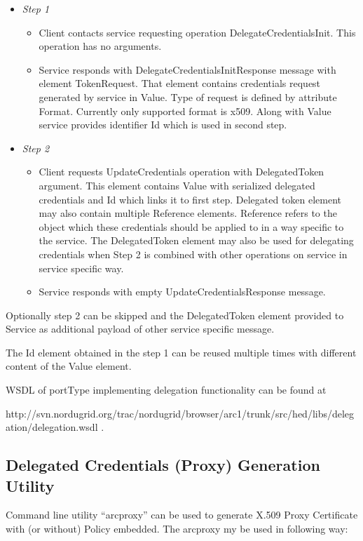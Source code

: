 \documentclass{article}                            %
\begin{document}
    \begin{itemize}
        \item \emph{Step 1}
            \begin{itemize}
                \item Client contacts service requesting operation DelegateCredentialsInit. This operation has no arguments.
                \item Service responds with DelegateCredentialsInitResponse message with element TokenRequest. That element contains credentials request generated by service in Value. Type of request is defined by attribute Format. Currently only supported format is x509. Along with Value service provides identifier Id which is used in second step.
            \end{itemize}
        \item \emph{Step 2}
            \begin{itemize}        
                \item Client requests UpdateCredentials operation with DelegatedToken argument. This element contains Value with serialized delegated credentials and Id which links it to first step. Delegated token element may also contain multiple Reference elements. Reference refers to the object which these credentials should be applied to in a way specific to the service. The DelegatedToken element may also be used for delegating credentials when Step 2 is combined with other operations on service in service specific way.
                \item Service responds with empty UpdateCredentialsResponse message.
            \end{itemize}
    \end{itemize}
Optionally step 2 can be skipped and the DelegatedToken element provided to Service as additional payload of other service specific message. 

The Id element obtained in the step 1 can be reused multiple times with different content of the Value element.

WSDL of portType implementing delegation functionality can be found at 

http://svn.nordugrid.org/trac/nordugrid/browser/arc1/trunk/src/hed/libs/delegation/delegation.wsdl .


\subsection{Delegated Credentials (Proxy) Generation Utility} %
\label{subsec:delegation_client}
Command line utility “arcproxy” can be used to generate X.509 Proxy Certificate with (or without)  Policy embedded.
The arcproxy my be used in following way:
\end{document}
